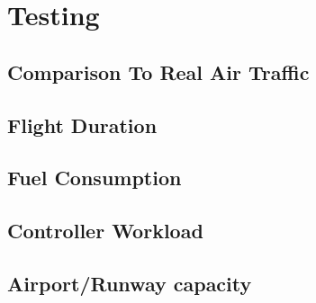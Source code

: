 \chapter{Testing}
\section{Comparison To Real Air Traffic}
\section{Flight Duration}
\section{Fuel Consumption}
\section{Controller Workload}
\section{Airport/Runway capacity}